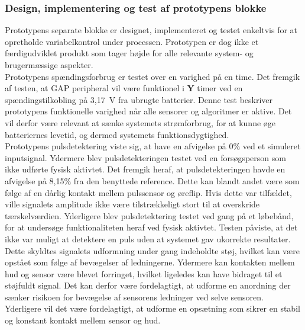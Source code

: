 \subsubsection{Design, implementering og test af prototypens blokke}
Prototypens separate blokke er designet, implementeret og testet enkeltvis for at opretholde variabelkontrol under processen. Prototypen er dog ikke et færdigudviklet produkt som tager højde for alle relevante system- og brugermæssige aspekter.\\
Prototypens spændingsforbrug er testet over en varighed på en time. Det fremgik af testen, at GAP peripheral vil være funktionel i \textbf{Y} timer ved en spændingstilkobling på 3,17~V fra ubrugte batterier. Denne test beskriver prototypens funktionelle varighed når alle sensorer og algoritmer er aktive. Det vil derfor være relevant at sænke systemets strømforbrug, for at kunne øge batteriernes levetid, og dermed systemets funktionsdygtighed.\\
Prototypens pulsdetektering viste sig, at have en afvigelse på 0\% ved et simuleret inputsignal. Ydermere blev pulsdetekteringen testet ved en forsøgsperson som ikke udførte fysisk aktivtet. Det fremgik heraf, at pulsdetekteringen havde en afvigelse på 8,15\% fra den benyttede reference. Dette kan blandt andet være som følge af en dårlig kontakt mellem pulssensor og øreflip. Hvis dette var tilfældet, ville signalets amplitude ikke være tilstrækkeligt stort til at overskride tærskelværdien. Yderligere blev pulsdetektering testet ved gang på et løbebånd, for at undersøge funktionaliteten heraf ved fysisk aktivtet. Testen påviste, at det ikke var muligt at detektere en puls uden at systemet gav ukorrekte resultater. Dette skyldtes signalets udformning under gang indeholdte støj, hvilket kan være opstået som følge af bevægelser af ledningerne. Ydermere kan kontakten mellem hud og sensor være blevet forringet, hvilket ligeledes kan have bidraget til et støjfuldt signal. Det kan derfor være fordelagtigt, at udforme en anordning der sænker risikoen for bevægelse af sensorens ledninger ved selve sensoren. Yderligere vil det være fordelagtigt, at udforme en opsætning som sikrer en stabil og konstant kontakt mellem sensor og hud.\\
